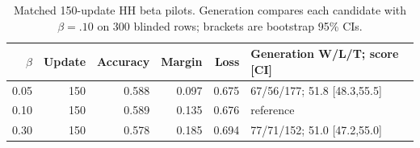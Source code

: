 \begin{table}[H]\centering\scriptsize\caption{Matched 150-update HH beta pilots. Generation compares each candidate with $\beta=.10$ on 300 blinded rows; brackets are bootstrap 95\% CIs.}\label{tab:hh-beta}\begin{tabular}{rrrrrl}\toprule $\beta$&Update&Accuracy&Margin&Loss&Generation W/L/T; score [CI]\\\midrule
0.05&150&0.588&0.097&0.675&67/56/177; 51.8 [48.3,55.5]\\
0.10&150&0.589&0.135&0.676&reference\\
0.30&150&0.578&0.185&0.694&77/71/152; 51.0 [47.2,55.0]\\
\bottomrule\end{tabular}\end{table}
